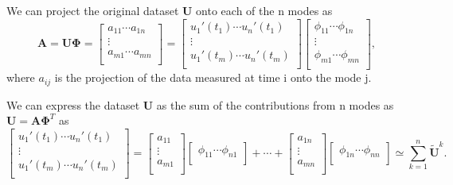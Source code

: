 \documentclass{article}
\begin{document}
We can project the original dataset $\bm{U}$ onto each of the n modes as 
\begin{equation}
  \bm{A} = \bm{U}\bm{\Phi} =
  \begin{bmatrix}
    a_{11} \cdots a_{1n}\\
    \vdots\\
    a_{m1} \cdots a_{mn}\\
  \end{bmatrix}
  = 
  \begin{bmatrix}
    u_1'(t_1) \cdots u_n'(t_1)\\
    \vdots\\
    u_1'(t_m) \cdots u_n'(t_m)\\
  \end{bmatrix} 
  \begin{bmatrix}
    \phi_{11} \cdots \phi_{1n}\\
    \vdots\\
    \phi_{m1} \cdots \phi_{mn}\\
  \end{bmatrix} 
  ,
\end{equation}
where $a_{ij}$ is the projection of the data measured at time i onto the mode j. \newline

We can express the dataset $\bm{U}$ as the sum of the contributions from n modes as 
$\bm{U} = \bm{A} \bm{\Phi}^T$ as
\begin{equation}
  \begin{bmatrix}
    u_1'(t_1) \cdots u_n'(t_1)\\
    \vdots\\
    u_1'(t_m) \cdots u_n'(t_m)\\
  \end{bmatrix} 
  =
  \begin{bmatrix}
    a_{11}\\
    \vdots\\
    a_{m1}\\
  \end{bmatrix} 
  \begin{bmatrix}
    \phi_{11} \cdots \phi_{n1}\\
  \end{bmatrix}
  +
  \cdots 
  +
  \begin{bmatrix}
    a_{1n}\\
    \vdots\\
    a_{mn}\\
  \end{bmatrix} 
  \begin{bmatrix}
    \phi_{1n} \cdots \phi_{nn}\\
  \end{bmatrix}
  \simeq \sum_{k=1}^n\bm{\tilde{U}}^k.
\end{equation}
\end{document}
